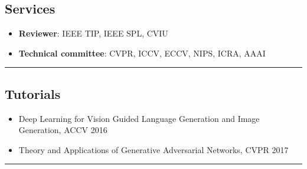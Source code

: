 \documentclass[10pt,letterpaper]{article}
\begin{document}
\subsection*{Services}
\begin{itemize}
\item {\bf Reviewer}: IEEE TIP, IEEE SPL, CVIU\vspace{-2mm}
\item {\bf Technical committee}: CVPR, ICCV, ECCV, NIPS, ICRA, AAAI\vspace{-2mm}
\end{itemize}
\hrule
\vspace{-0.4em}
\subsection*{Tutorials}
\begin{itemize}
\item Deep Learning for Vision Guided Language Generation and Image Generation, ACCV 2016\vspace{-2mm}
\item Theory and Applications of Generative Adversarial Networks, CVPR 2017\vspace{-2mm}
\end{itemize}
\hrule
\vspace{-0.4em}
\end{document}
